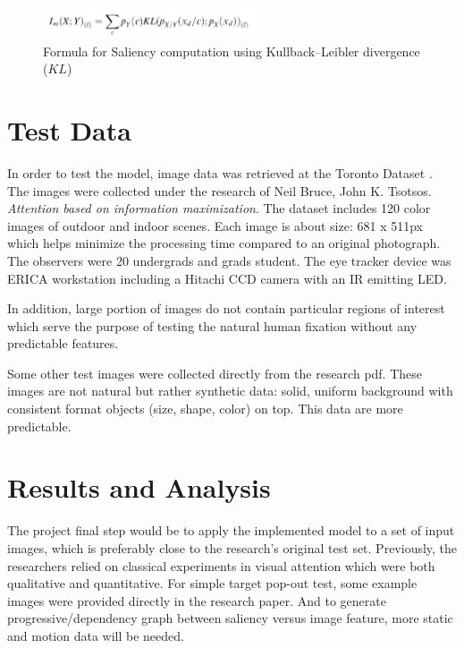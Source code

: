 \documentclass[conference]{IEEEtran}
\begin{document}
\begin{figure}[h]
    \centering
    \includegraphics[width=2.5in]{KL.png}
    \caption{Formula for Saliency computation using Kullback–Leibler divergence ($KL$) }
    \label{fig:kl_formula}
\end{figure}

\section{Test Data}
In order to test the model, image data was retrieved at the Toronto Dataset \cite{MITBenchmark_2012}. The images were collected under the research of Neil Bruce, John K. Tsotsos. \textit{Attention based on information maximization}. The dataset includes 120 color images of outdoor and indoor scenes. Each image is about size: 681 x 511px which helps minimize the processing time compared to an original photograph. The observers were 20 undergrads and grads student. The eye tracker device was ERICA workstation including a Hitachi CCD camera with an IR emitting LED.

In addition, large portion of images do not contain particular regions of interest which serve the purpose of testing the natural human fixation without any predictable features. 

Some other test images were collected directly from the research pdf. These images are not natural but rather synthetic data: solid, uniform background with consistent format objects (size, shape, color) on top. This data are more predictable.

\section{Results and Analysis}
The project final step would be to apply the implemented model to a set of input images, which is preferably close to the research’s original test set. Previously, the researchers relied on classical experiments in visual attention which were both qualitative and quantitative. For simple target pop-out test, some example images were provided directly in the research paper. And to generate progressive/dependency graph between saliency versus image feature, more static and motion data will be needed. 
\end{document}

